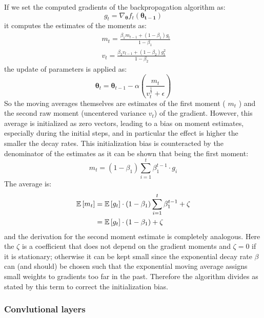 If we set the computed gradients of the backpropagation algorithm as:
\begin{equation}
    g_t = \nabla_{\bm{\theta}} f_t(\bm{\theta_{t-1}})
\end{equation}
it computes the estimates of the moments as:
\begin{align}
    & m_t = \frac{\beta_1 m_{t-1} + (1 - \beta_1) g_t  }{1-\beta_1} \\
    & v_t = \frac{\beta_2 v_{t-1} + (1 - \beta_2) g_t^2}{1-\beta_2}
\end{align}
the update of parameters is applied as:
\begin{equation}
    \bm{\theta}_t = \bm{\theta}_{t-1} - \alpha \left( \frac{m_t}{v_t^\frac{1}{2} + \epsilon} \right)
\end{equation}
So the moving averages themselves are estimates of the first moment ( $m_t$ ) and the second raw moment (uncentered variance $v_t$) of the gradient.  However, this average is initialized as zero vectors, leading to a bias on moment estimates, especially during the initial steps, and in particular the effect is higher the smaller the decay rates. This initialization bias is counteracted by the denominator of the estimates as it can be shown that being the first moment:
\begin{equation}
    m_t = (1 - \beta_1) \sum_{i=1}^t \beta_1^{t-1} \cdot g_i
\end{equation}
The average is:
\begin{align*}
    \mathbb{E} \left[ m_t \right] &= \mathbb{E} \left[ g_t \right] \cdot (1-\beta_1) \sum_{i=1}^t \beta_1^{t-1} + \zeta \\
                      &= \mathbb{E} \left[ g_t \right] \cdot (1-\beta_1) + \zeta
\end{align*}
and the derivation for the second moment estimate is completely analogous.
Here the $\zeta$ is a coefficient that does not depend on the gradient moments and $\zeta = 0$ if it is stationary; otherwise it can be kept small since the exponential decay rate $\beta$ can (and should) be chosen such that the exponential moving average
assigns small weights to gradients too far in the past. Therefore the algorithm divides as stated by this term to correct the initialization bias.


\subsubsection{Convlutional layers}

